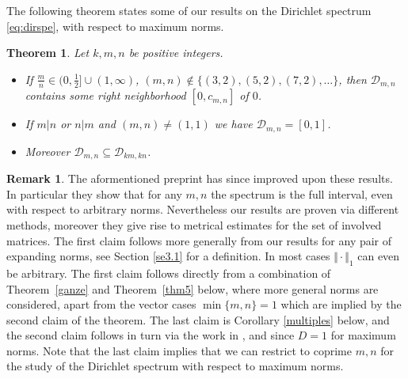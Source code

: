 \documentclass[10pt]{amsart}
\newtheorem{theorem}{Theorem}[section]
\theoremstyle{definition}
\newtheorem{remark}{Remark}
\newcommand{\Q}{\mathbb{Q}}
\begin{document}
 \par




The following theorem states some of our results on the Dirichlet spectrum \eqref{eq:dirspe}, with respect to maximum norms.


\begin{theorem} \label{neuth}
Let $k,m,n$ be positive integers.
\begin{itemize}
    \item If $\tfrac{m}{n} \in (0,\tfrac{1}{2}]\cup (1,\infty)$, $
(m,n)\notin \{ (3,2), (5,2), (7,2),\ldots \}$, then $\mathcal{D}_{m,n}$
contains some right neighborhood $[0,c_{m,n}]$ of $0$. 
\item If $m\vert n$ or $n\vert m$ and $(m,n)\ne (1,1)$ we have $\mathcal{D}_{m,n}=[0,1]$. 
\item Moreover \label{eq:teilen}
$\mathcal{D}_{m,n} \subseteq \mathcal{D}_{km,kn}$.

\end{itemize}



\end{theorem}

\begin{remark}
 The aformentioned preprint \cite{AginWeiss2024} has since improved upon these results. In particular they show that for any $m,n$ the spectrum is the full interval, even with respect to arbitrary norms. Nevertheless our results are proven via different methods, moreover they give rise to metrical estimates for the set of involved matrices. The first claim follows more generally from our results for any pair of expanding norms, see Section \ref{se3.1} for a definition. In most cases $\Vert\cdot \Vert_1$ can even be arbitrary. The first claim follows directly from a combination of Theorem~\ref{ganze} and Theorem~\ref{thm5} below, where more general norms are considered, apart from the vector cases $\min\{m,n\}=1$ which are implied by the second claim of the theorem.
The last claim is Corollary \ref{multiples} below, and the second claim follows in turn via the work in \cite{j1, j2}, and since $D=1$ for maximum norms. Note that the last claim implies that we can restrict to coprime $m,n$ for the study of the Dirichlet spectrum with respect to maximum norms. 
\end{remark}
\end{document}
